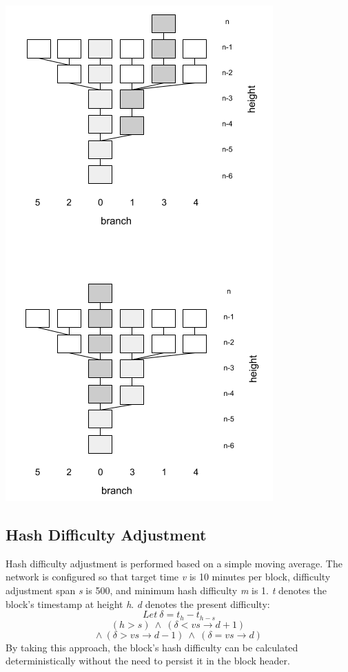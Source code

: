 \documentclass[10pt,twocolumn]{article}
\begin{document}
\includegraphics[width=1.00\linewidth]{branch_restructure3.png}
\subsection{Hash Difficulty Adjustment}
Hash difficulty adjustment is performed based on a simple moving average.  The network is configured so that target time \textit{v} is 10 minutes per block, difficulty adjustment span \textit{s} is 500, and minimum hash difficulty \textit{m} is 1.  \textit{t} denotes the block's timestamp at height \textit{h}. \textit{d} denotes the present difficulty:
\[Let\ \delta = t_h - t_{h-s}\]
\[(h>s)\ \wedge\ (\delta<vs\rightarrow d+1)\ \]\[ \wedge\ (\delta>vs\rightarrow d-1)\ \wedge\ (\delta=vs\rightarrow d)\]
By taking this approach, the block's hash difficulty can be calculated deterministically without the need to persist it in the block header.
\end{document}
